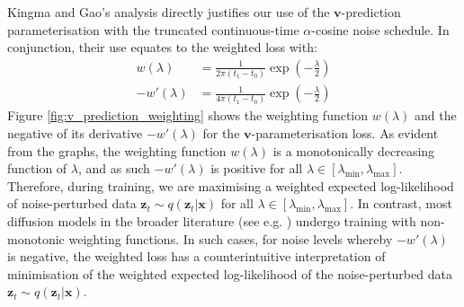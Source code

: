 \documentclass[ oneside,%
                    author={George Herbert},
                    degree={MSci},
                     title={Video Diffusion Models for Climate Simulations},
                  subtitle={}]{dissertation}
\begin{document}
Kingma and Gao's \cite{Understanding_Diffusion_Objective_Kingma} analysis directly justifies our use of the $\mathbf{v}$-prediction parameterisation with the truncated continuous-time $\alpha$-cosine noise schedule. In conjunction, their use equates to the weighted loss with:
\begin{align}
      w(\lambda)&=\frac{1}{2\pi(t_1-t_0)}\exp\left(-\frac{\lambda}{2}\right)\\
      -w'(\lambda)&=\frac{1}{4\pi(t_1-t_0)}\exp\left(-\frac{\lambda}{2}\right)
\end{align}
Figure \ref{fig:v_prediction_weighting} shows the weighting function $w(\lambda)$ and the negative of its derivative $-w'(\lambda)$ for the $\mathbf{v}$-parameterisation loss. As evident from the graphs, the weighting function $w(\lambda)$ is a monotonically decreasing function of $\lambda$, and as such $-w'(\lambda)$ is positive for all $\lambda\in [\lambda_{\min}, \lambda_{\max}]$. Therefore, during training, we are maximising a weighted expected log-likelihood of noise-perturbed data $\mathbf{z}_t\sim q(\mathbf{z}_t|\mathbf{x})$ for all $\lambda\in[\lambda_{\min}, \lambda_{\max}]$. In contrast, most diffusion models in the broader literature (see e.g. \cite{DDPM_Ho,IDDPM_Nichol,Imagen_Saharia}) undergo training with non-monotonic weighting functions. In such cases, for noise levels whereby $-w'(\lambda)$ is negative, the weighted loss has a counterintuitive interpretation of minimisation of the weighted expected log-likelihood of the noise-perturbed data $\mathbf{z}_t\sim q(\mathbf{z}_t|\mathbf{x})$.
\end{document}
